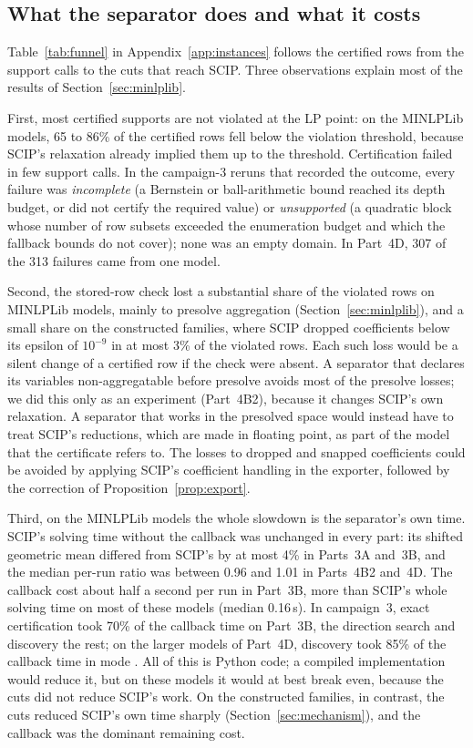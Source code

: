 \subsection{What the separator does and what it costs}\label{sec:funnel}

Table~\ref{tab:funnel} in Appendix~\ref{app:instances} follows the certified
rows from the support calls to the cuts that reach SCIP. Three observations explain most of the results of
Section~\ref{sec:minlplib}.



First, most certified supports are not violated at the LP point: on the
MINLPLib models, 65 to 86\% of the certified rows fell below the violation
threshold, because SCIP's relaxation already implied them up to the
threshold. Certification failed in few support calls. In the campaign-3 reruns
that recorded the outcome, every failure was \emph{incomplete} (a Bernstein
or ball-arithmetic bound reached its depth budget, or did not certify the
required value) or \emph{unsupported} (a quadratic block whose number of row
subsets exceeded the enumeration budget and which the fallback bounds do not
cover); none was an empty domain. In Part~4D, 307 of the 313 failures came
from one model.

Second, the stored-row check lost a substantial share of the violated rows
on MINLPLib models, mainly to presolve aggregation (Section~\ref{sec:minlplib}),
and a small share on the constructed families, where SCIP dropped coefficients
below its epsilon of $10^{-9}$ in at most 3\% of the violated rows. Each such loss would
be a silent change of a certified row if the check were absent. A separator
that declares its variables non-aggregatable before presolve avoids most of the
presolve losses; we did this only as an experiment (Part~4B2), because it
changes SCIP's own relaxation. A separator that works in the presolved space
would instead have to treat SCIP's reductions, which are made in floating
point, as part of the model that the certificate refers to. The losses to dropped and snapped coefficients could be avoided by
applying SCIP's coefficient handling in the exporter, followed by the
correction of Proposition~\ref{prop:export}.

Third, on the MINLPLib models the whole slowdown is the separator's own time.
SCIP's solving time without the callback was unchanged in every part: its
shifted geometric mean differed from SCIP's by at most 4\% in Parts~3A
and~3B, and the median per-run ratio was between 0.96 and 1.01 in Parts~4B2
and~4D. The callback cost about half a second per run in Part~3B, more than
SCIP's whole solving time on most of these models (median 0.16\,s). In
campaign~3, exact certification took 70\% of the callback time on Part~3B, the
direction search and discovery the rest; on the larger models of Part~4D,
discovery took 85\% of the callback time in mode . All of this is
Python code; a compiled implementation would reduce it, but on these models it
would at best break even, because the cuts did not reduce SCIP's work. On the
constructed families, in contrast, the cuts reduced SCIP's own time sharply
(Section~\ref{sec:mechanism}), and the callback was the dominant remaining cost.
